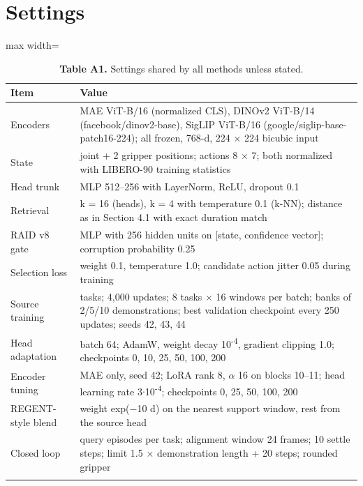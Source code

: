 \documentclass[10pt,twocolumn,letterpaper]{article}
\begin{document}
\section{Settings}

\begin{table}[h!]\centering\footnotesize\setlength{\tabcolsep}{3.5pt}
\caption*{\textbf{\sffamily Table A1.} Settings shared by all methods unless stated.}
\begin{adjustbox}{max width=\linewidth}
\begin{tabular}{@{}
  >{\raggedright\arraybackslash}p{}
  >{\raggedright\arraybackslash}p{}@{}}
\toprule\noalign{}
\begin{minipage}[b]{\linewidth}\raggedright
Item
\end{minipage} & \begin{minipage}[b]{\linewidth}\raggedright
Value
\end{minipage} \\
\midrule\noalign{}
Encoders & MAE ViT-B/16 (normalized CLS), DINOv2 ViT-B/14 (facebook/dinov2-base), SigLIP ViT-B/16 (google/siglip-base-patch16-224); all frozen, 768-d, 224 \ensuremath{\times} 224 bicubic input \\
State & 7 joint + 2 gripper positions; actions 8 \ensuremath{\times} 7; both normalized with LIBERO-90 training statistics \\
Head trunk & MLP 512--256 with LayerNorm, ReLU, dropout 0.1 \\
Retrieval & k = 16 (heads), k = 4 with temperature 0.1 (k-NN); distance as in Section 4.1 with exact duration match \\
RAID v8 gate & MLP with 256 hidden units on {[}state, confidence vector{]}; corruption probability 0.25 \\
Selection loss & weight 0.1, temperature 1.0; candidate action jitter 0.05 during training \\
Source training & 90 tasks; 4,000 updates; 8 tasks \ensuremath{\times} 16 windows per batch; banks of 2/5/10 demonstrations; best validation checkpoint every 250 updates; seeds 42, 43, 44 \\
Head adaptation & batch 64; AdamW, weight decay 10\textsuperscript{-4}, gradient clipping 1.0; checkpoints 0, 10, 25, 50, 100, 200 \\
Encoder tuning & MAE only, seed 42; LoRA rank 8, \ensuremath{\alpha} 16 on blocks 10--11; head learning rate 3\ensuremath{\cdot}10\textsuperscript{-4}; checkpoints 0, 25, 50, 100, 200 \\
REGENT-style blend & weight exp(\ensuremath{-}10 d) on the nearest support window, rest from the source head \\
Closed loop & 20 query episodes per task; alignment window 24 frames; 10 settle steps; limit 1.5 \ensuremath{\times} demonstration length + 20 steps; rounded gripper \\
\bottomrule\noalign{}
\end{tabular}
\end{adjustbox}
\end{table}
\end{document}
